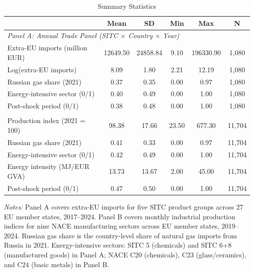 \begin{table}[htbp]
\centering
\caption{Summary Statistics}
\label{tab:sumstats}
\begin{tabular}{lccccc}
\toprule
 & Mean & SD & Min & Max & N \\
\midrule
\multicolumn{6}{l}{\textit{Panel A: Annual Trade Panel (SITC $\times$ Country $\times$ Year)}} \\
\addlinespace
Extra-EU imports (million EUR) & 12649.50 & 24858.84 & 9.10 & 196330.90 & 1,080 \\
Log(extra-EU imports) & 8.09 & 1.80 & 2.21 & 12.19 & 1,080 \\
Russian gas share (2021) & 0.37 & 0.35 & 0.00 & 0.97 & 1,080 \\
Energy-intensive sector (0/1) & 0.40 & 0.49 & 0.00 & 1.00 & 1,080 \\
Post-shock period (0/1) & 0.38 & 0.48 & 0.00 & 1.00 & 1,080 \\
\addlinespace
\multicolumn{6}{l}{\textit{Panel B: Monthly Production Panel (NACE $\times$ Country $\times$ Month)}} \\
\addlinespace
Production index (2021 = 100) & 98.38 & 17.66 & 23.50 & 677.30 & 11,704 \\
Russian gas share (2021) & 0.41 & 0.33 & 0.00 & 0.97 & 11,704 \\
Energy-intensive sector (0/1) & 0.42 & 0.49 & 0.00 & 1.00 & 11,704 \\
Energy intensity (MJ/EUR GVA) & 13.73 & 13.67 & 2.00 & 45.00 & 11,704 \\
Post-shock period (0/1) & 0.47 & 0.50 & 0.00 & 1.00 & 11,704 \\
\bottomrule
\end{tabular}
\begin{tablenotes}[flushleft]
\small
\item \textit{Notes:} Panel A covers extra-EU imports for five SITC product groups across 27 EU member states, 2017--2024. Panel B covers monthly industrial production indices for nine NACE manufacturing sectors across EU member states, 2019--2024. Russian gas share is the country-level share of natural gas imports from Russia in 2021. Energy-intensive sectors: SITC 5 (chemicals) and SITC 6+8 (manufactured goods) in Panel A; NACE C20 (chemicals), C23 (glass/ceramics), and C24 (basic metals) in Panel B.
\end{tablenotes}
\end{table}
